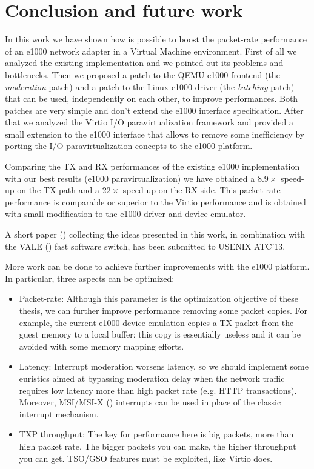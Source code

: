 \chapter*{Conclusion and future work}
In this work we have shown how is possible to boost the packet-rate performance of an e1000 network adapter in a Virtual
Machine environment.
First of all we analyzed the existing implementation and we pointed out its problems and bottlenecks.
Then we proposed a patch to the QEMU e1000 frontend (the \emph{moderation} patch) and a patch to the Linux e1000 driver (the \emph{batching}
patch) that can be used, independently on each other, to improve performances. Both patches are very simple and don't extend the e1000
interface specification.
After that we analyzed the Virtio I/O paravirtualization framework and provided a small extension to the e1000 interface that allows to remove
some inefficiency by porting the I/O paravirtualization concepts to the e1000 platform.

\vspace{0.5cm}

Comparing the TX and RX performances of the existing e1000 implementation with our best results (e1000 paravirtualization) we have obtained
a $8.9 \times$ speed-up on the TX path and a $22 \times$ speed-up on the RX side.
This packet rate performance is comparable or superior to the Virtio performance and is obtained with small modification to the e1000
driver and device emulator.

A short paper (\cite{ref:e1000-opt}) collecting the ideas presented in this work, in combination with the VALE (\cite{ref:vale}) fast 
software switch, has been submitted to USENIX ATC'13.

\vspace{0.5cm}

More work can be done to achieve further improvements with the e1000 platform. In particular, three aspects can be optimized:
\begin{itemize}
  \item Packet-rate: Although this parameter is the optimization objective of these thesis, we can further improve performance removing
	some packet copies. For example, the current e1000 device emulation copies a TX packet from the guest memory to a local buffer: this
	copy is essentially useless and it can be avoided with some memory mapping efforts.
	
  \item Latency: Interrupt moderation worsens latency, so we should implement some euristics aimed at bypassing moderation delay
	when the network traffic requires low latency more than high packet rate (e.g. HTTP transactions).
	Moreover, MSI/MSI-X (\cite{ref:msi}) interrupts can be used in place of the classic interrupt mechanism.
	
  \item TXP throughput: The key for performance here is big packets, more than high packet rate. The bigger packets you can make, the
	higher throughput you can get. TSO/GSO features must be exploited, like Virtio does.
\end{itemize}
